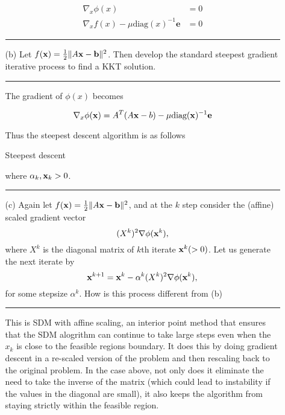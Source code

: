 \documentclass{article} %
\newenvironment{strategy}[1][H]
  { \renewcommand{\algorithmcfname}{}%
   \begin{algorithm}[#1]%
  }{\end{algorithm}}
\newcommand{\B}[1]{\mathbf#1}
\renewcommand\b{{\bf b}}
\newcommand\x{{\bf x}}
\begin{document}
\begin{enumerate}
\begin{itemize}
\begin{equation*}
\begin{aligned}
\nabla_x \phi(x) &= 0 \\ 
\nabla_x f(x) - \mu \mbox{diag}(x)^{-1} \B{e} &= 0
\end{aligned}
\end{equation*}


\rule{\textwidth}{1pt}

\item[(b)] Let $f(\x)=\frac{1}{2}\|A\x-\b\|^2$. Then develop the standard steepest gradient iterative process to find a KKT solution.

\rule{\textwidth}{1pt}
The gradient of $\phi(x)$ becomes 

\[
\nabla_x \phi(\x) = A^T(A\x - b) - \mu \mbox{diag}(\x)^{-1} \B{e}
\]

Thus the steepest descent algorithm is as follows 

 \begin{strategy}
\caption{Steepest descent}
\end{strategy}

where $\alpha_k, \x_k > 0$. 

\rule{\textwidth}{1pt}

\item[(c)] Again let $f(\x)=\frac{1}{2}\|A\x-\b\|^2$, and at the $k$ step consider the (affine) scaled gradient vector
\[(X^k)^2\nabla\phi(\x^k),\]
where $X^k$ is the diagonal matrix of $k$th iterate $\x^k(>0)$. Let us generate the next iterate by
\[\x^{k+1}=\x^k-\alpha^k(X^k)^2\nabla\phi(\x^k),\]
for some stepsize $\alpha^k$. How is this process different from (b)

\rule{\textwidth}{1pt}
This is SDM with affine scaling, an interior point method that ensures that the SDM alogrithm can continue to take large steps even when the $x_k$ is close to the feasible regions boundary. It does this by doing gradient descent in a re-scaled version of the problem and then rescaling back to the original problem. In the case above, not only does it eliminate the need to take the inverse of the matrix (which could lead to instability if the values in the diagonal are small), it also keeps the algorithm from staying strictly within the feasible region.


\end{itemize}
\end{enumerate}
\end{document}
